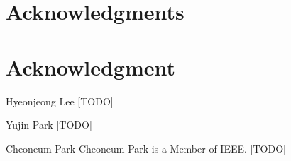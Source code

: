 \documentclass[10pt,journal,compsoc]{IEEEtran}
\begin{document}
\ifCLASSOPTIONcompsoc
  \section*{Acknowledgments}
\else
  \section*{Acknowledgment}
\fi
[TODO]

\ifCLASSOPTIONcaptionsoff
  \newpage
\fi




\begin{IEEEbiographynophoto}{Hyeonjeong Lee}
  [TODO]
\end{IEEEbiographynophoto}

\begin{IEEEbiographynophoto}{Yujin Park}
  [TODO]
\end{IEEEbiographynophoto}

\begin{IEEEbiographynophoto}{Cheoneum Park}
  Cheoneum Park is a Member of IEEE. [TODO]
\end{IEEEbiographynophoto}
\end{document}
